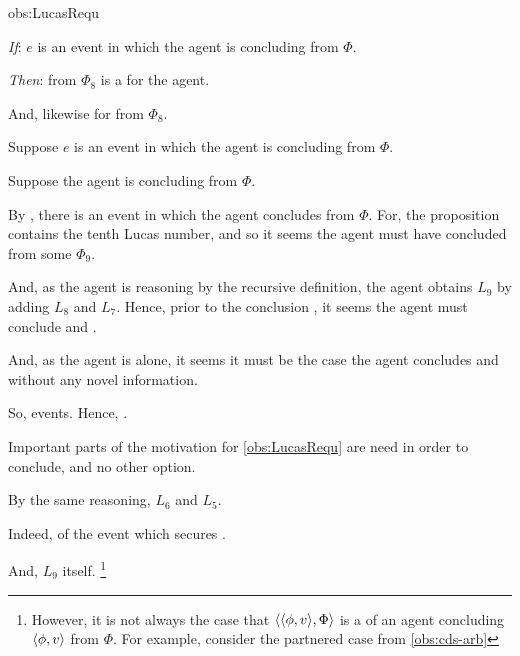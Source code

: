 \begin{note}
\begin{motivation}{obs:LucasRequ}
    \begin{itenum}
    \item[\emph{If}:]
      \(e\) is an event in which the agent is concluding\newline {} from \(\Phi\).
    \item[\emph{Then}:]
       from \(\Phi_{8}\) is a \fc{} for the agent.
    \end{itenum}
    And, likewise for  from \(\Phi_{8}\).

    Suppose \(e\) is an event in which the agent is concluding  from \(\Phi\).

    Suppose the agent is concluding  from \(\Phi\).

    By \assuPP{}, there is an event in which the agent concludes\newline {} from \(\Phi\).
    For, the proposition contains the tenth Lucas number, and so it seems the agent must have concluded  from some \pool{} \(\Phi_{9}\).

    And, as the agent is reasoning by the recursive definition, the agent obtains \(L_{9}\) by adding \(L_{8}\) and \(L_{7}\).
    Hence, prior to the conclusion , it seems the agent must conclude  and .

    And, as the agent is alone, it seems it must be the case the agent concludes  and  without any novel information.

    So, events.
    Hence, .
  \end{motivation}

  Important parts of the motivation for \autoref{obs:LucasRequ} are need in order to conclude, and no other option.

  By the same reasoning, \(L_{6}\) and \(L_{5}\).

  Indeed,  of the event which secures \fc{}.

  And, \(L_{9}\) itself.%
  \footnote{
    However, it is not always the case that \(\langle \langle \phi, v \rangle, \Phi \rangle\) is a \requ{} of an agent concluding \(\langle \phi, v \rangle\) from \(\Phi\).
    For example, consider the partnered case from \autoref{obs:cds-arb}
  }
\end{note}

